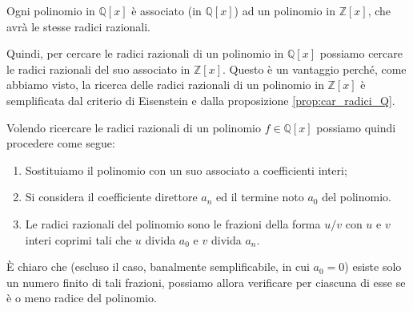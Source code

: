\begin{osservation}
	Ogni polinomio in $\mathbb{Q}[x]$ è associato (in $\mathbb{Q}[x]$) ad un polinomio in $\mathbb{Z}[x]$, che avrà le stesse radici razionali. 
\end{osservation}

Quindi, per cercare le radici razionali di un polinomio in $\mathbb{Q}[x]$ possiamo cercare le radici razionali del suo associato in $\mathbb{Z}[x]$. Questo è un vantaggio perché, come abbiamo visto, la ricerca delle radici razionali di un polinomio in $\mathbb{Z}[x]$ è semplificata dal criterio di Eisenstein e dalla proposizione \ref{prop:car_radici_Q}.
 
Volendo ricercare le radici razionali di un polinomio $f \in \mathbb{Q}[x]$ possiamo quindi procedere come segue:
\begin{enumerate}
	\item Sostituiamo il polinomio con un suo associato a coefficienti interi;
	\item Si considera il coefficiente direttore $a_{n}$ ed il termine noto $a_{0}$ del polinomio.
	\item Le radici razionali del polinomio sono le frazioni della forma $u/v$ con $u$ e $v$ interi coprimi tali che $u$ divida $a_{0}$ e $v$ divida $a_{n}$.
\end{enumerate}

È chiaro che (escluso il caso, banalmente semplificabile, in cui $a_{0}=0$) esiste solo un numero finito di tali frazioni, possiamo allora verificare per ciascuna di esse se è o meno radice del polinomio.


